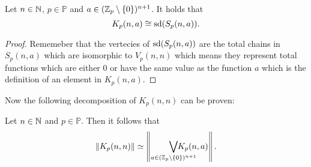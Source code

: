\begin{rem}
  Let $n\in\mathbb{N}$, $p\in\mathbb{P}$ and $a\in (\mathbb{Z}_p\setminus\{0\})^{n+1}$. It holds that
  \begin{equation*}
    K_p(n,a) \cong {\rm sd}(S_p(n,a)).
  \end{equation*}
\end{rem}

\begin{proof}
  Rememeber that the vertecies of ${\rm sd}(S_p(n,a))$ are the total chains in $S_p(n,a)$ which are isomorphic to $V_p(n,n)$ which means they represent total functions which are either 0 or have the same value as the function $a$ which is the definition of an element in $K_p(n,a)$.
\end{proof}

Now the following decomposition of $K_p(n,n)$ can be proven:
\begin{lemma}
  Let $n\in\mathbb{N}$ and $p\in\mathbb{P}$. Then it follows that
  \begin{equation*}
    \left\lVert K_p(n,n) \right\rVert \simeq \left\lVert \bigvee_{a\in(\Z_p\setminus\{0\})^{n+1}}\hspace*{-24px}K_p(n,a)\right\rVert.
  \end{equation*}
\end{lemma}
